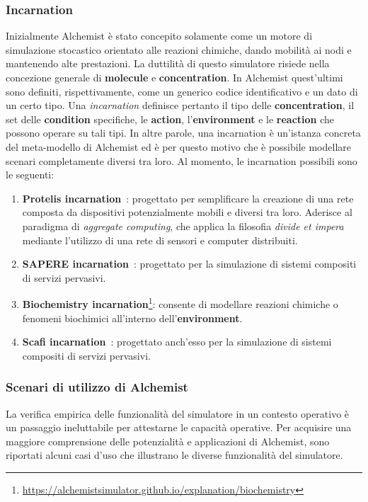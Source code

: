 \subsubsection{Incarnation}
Inizialmente Alchemist è stato concepito solamente come un motore di simulazione stocastico orientato alle reazioni chimiche, dando mobilità ai nodi e mantenendo alte prestazioni. 
La duttilità di questo simulatore risiede nella concezione generale di \textbf{molecule} e \textbf{concentration}. In Alchemist quest'ultimi sono definiti, rispettivamente, come un generico codice identificativo e un dato di un certo tipo. Una \textit{incarnation} definisce pertanto il tipo delle \textbf{concentration}, il set delle \textbf{condition} specifiche, le \textbf{action}, l'\textbf{environment} e le \textbf{reaction} che possono operare su tali tipi.
In altre parole, una incarnation è un'istanza concreta del meta-modello di Alchemist ed è per questo motivo che è possibile modellare scenari completamente diversi tra loro.
Al momento, le incarnation possibili sono le seguenti:
\begin{enumerate}
	\item \textbf{Protelis incarnation}~\cite{Pianini2015}:  progettato per semplificare la creazione di una rete composta da dispositivi potenzialmente mobili e diversi tra loro. Aderisce al paradigma di \textit{aggregate computing}, che applica la filosofia \textit{divide et impera} mediante l'utilizzo di una rete di sensori e computer distribuiti.
	\item \textbf{SAPERE incarnation}~\cite{Zambonelli2015}: progettato per la simulazione di sistemi compositi di servizi pervasivi.
	\item \textbf{Biochemistry incarnation}\footnote{\url{https://alchemistsimulator.github.io/explanation/biochemistry}}: consente di modellare reazioni chimiche o fenomeni biochimici all'interno dell'\textbf{environment}.
	\item \textbf{Scafi incarnation}~\cite{Casadei2022}:  progettato anch'esso per la simulazione di sistemi compositi di servizi pervasivi.
\end{enumerate}

\subsubsection{Scenari di utilizzo di Alchemist}
La verifica empirica delle funzionalità del simulatore in un contesto operativo è un passaggio ineluttabile per attestarne le capacità operative. Per acquisire una maggiore comprensione delle potenzialità e applicazioni di Alchemist, sono riportati alcuni casi d'uso che illustrano le diverse funzionalità del simulatore.

